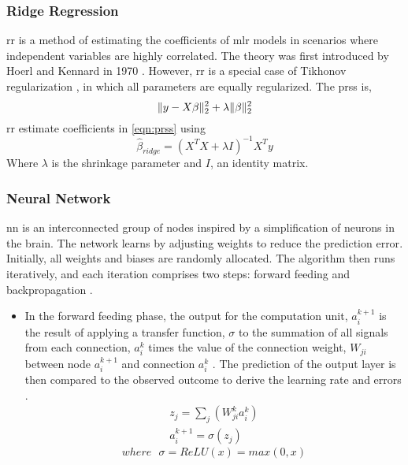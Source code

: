 \begin{sloppypar}
	\subsubsection{Ridge Regression}
	\ac{rr} \citep{Shewhart2015} is a method of estimating the coefficients of \ac{mlr} models in scenarios where independent variables are highly correlated. \newline
	The theory was first introduced by Hoerl and Kennard in 1970 \citep{hoerl1970ridge}. However, \ac{rr} is a special case of Tikhonov regularization \citep{tikhonov1966stability}, in which all parameters are equally regularized. The \ac{prss} is,
		\begin{equation} \label{eqn:prss}
		\lVert y - X\beta\rVert_2^2 + \lambda \lVert\beta\rVert_2^2
		\end{equation}
		\ac{rr} estimate coefficients in \ref{eqn:prss} using
		\begin{equation}
		\hat{\beta}_{ridge} = (X^{T} X + \lambda I)^{-1} X^{T} y
		\end{equation}
		Where $ \lambda $ is the shrinkage parameter and $ I $, an identity matrix.
	
	\subsubsection{Neural Network}
	\ac{nn} is an interconnected group of nodes inspired by a simplification of neurons in the brain. The network learns by adjusting weights to reduce the prediction error\citep{han2011data}. Initially, all weights and biases are randomly allocated. The algorithm then runs iteratively, and each iteration comprises two steps: forward feeding and backpropagation \citep{Phan2019}.

		\begin{itemize}%
			\item In the forward feeding phase, the output for the computation unit, $ a_i^{k+1} $ is the result of applying a transfer function, $ \sigma $ to the summation of all signals from each connection, $ a_i^k $ times the value of the connection weight, $ W_{ji} $ between node $ a_i^{k+1} $ and connection $ a_i^{k} $ \citep{coakley2000artificial}. The prediction of the output layer is then compared to the observed outcome to derive the learning rate and errors \citep{Phan2019}.
			\begin{eqnarray}
			z_j = \sum_j (W_{ji}^k a_i^k) \\
			a_i^{k+1} = \sigma (z_j)
			\end{eqnarray}
			\begin{equation*}
			where \ \ \ \sigma = ReLU(x) = max(0,x)
			\end{equation*}
			

\end{itemize}
\end{sloppypar}
